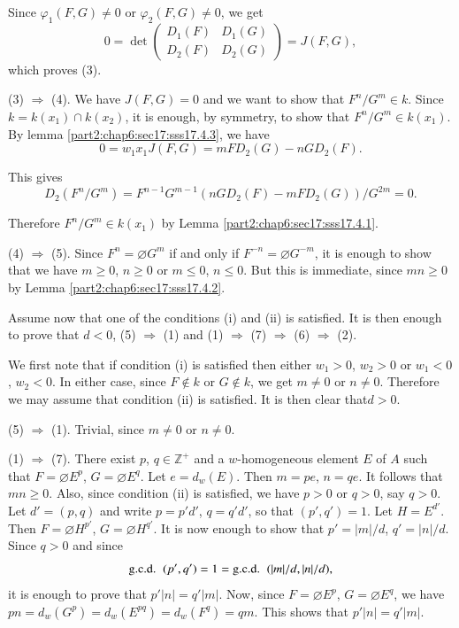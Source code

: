 Since $\varphi_1 (F, G) \neq 0$ or $\varphi_2 (F, G)\neq 0$, we get
$$
0 =\det 
\begin{pmatrix}
D_1 (F) & D_1 (G)\\
D_2 (F) & D_2 (G)
\end{pmatrix} = J(F, G),
$$
which proves (3).

(3) $\Rightarrow$ (4). We have $J(F, G)=0$ and we want to show that
$F^n/G^m \in k$. Since $k= k(x_1) \cap k(x_2)$, it is enough, by
symmetry, to show that $F^n/G^m \in k(x_1)$. By
lemma \ref{part2:chap6:sec17:sss17.4.3}, we have
$$
0 = w_1 x_1 J(F, G) = m F D_2 (G) - n G D_2 (F).
$$  

This gives 
$$
D_2 (F^n / G^m) = F^{n-1} G^{m-1} (n G D_2 (F)- m F D_2 (G))/G^{2m}=0.
$$

Therefore $F^n/ G^m \in k(x_1)$ by Lemma
\ref{part2:chap6:sec17:sss17.4.1}. 

(4) $\Rightarrow$ (5). Since $F^n = \diameter G^m$ if and only if
$F^{-n}= \diameter G^{-m}$, it is enough to show that we have $m \geq
0$, $n \geq 0$ or $m \leq 0$, $n \leq 0$. But this is immediate, since
$mn \geq 0$ by Lemma \ref{part2:chap6:sec17:sss17.4.2}.

Assume now that one of the conditions (i) and (ii) is satisfied. It is
then enough to prove that $d < 0$, (5) $\Rightarrow$ (1) and (1)
$\Rightarrow$ (7) $\Rightarrow$ (6) $\Rightarrow$ (2).

We first note that if condition (i) is satisfied then either $w_1 >
0$, $w_2 > 0$ or $w_1 < 0$, $w_2 < 0$. In either case, since $F \notin
k$ or $G \notin k$, we get $m \neq 0$ or $n \neq 0$. Therefore we may
assume that condition (ii) is satisfied. It is then clear
that\pageoriginale $d> 0$.

(5) $\Rightarrow$ (1). Trivial, since $m \neq 0$ or $n \neq 0$.

(1) $\Rightarrow$ (7). There exist $p$, $q \in \mathbb{Z}^+$ and a
$w$-homogeneous element $E$ of $A$ such that $F= \diameter E^p$, $G =
\diameter E^q$. Let $e = d_w (E)$. Then $m = pe$, $n = qe$. It
follows that $mn\geq 0$. Also, since condition (ii) is satisfied, we
have $p > 0$ or $q> 0$, say $q>0$. Let $d' =$\gcd $(p, q)$ and write
$p = p' d'$, $q= q'd'$, so that \gcd $(p' , q')=1$. Let $H=
E^{d'}$. Then $F= \diameter H^{p'}$, $G= \diameter H^{q'}$. It is now
enough to show that $p' = |m|/d$, $q'= |n|/d$. Since $q>0$ and since
$$
\text{\gcd} ~ (p', q')=1 = \text{\gcd}~ (|m|/d, |n|/d),
$$
it is enough to prove that $p' |n|= q'|m|$. Now, since $F= \diameter
E^p$, $G= \diameter E^q$, we have $pn = d_w (G^p) = d_w(E^{pq})=d_w
(F^q)= qm$. This shows that $p' |n|= q' |m|$.

